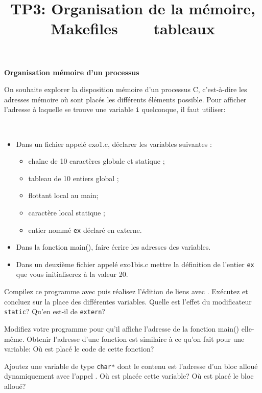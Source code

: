 \documentclass[10pt]{article}\usepackage[nu]{esial}
\begin{document}
\title{TP3: Organisation de la mémoire, Makefiles ~~~  tableaux}
\maketitle

\begin{Exercice}\textbf{Organisation mémoire d'un processus}

On souhaite explorer la disposition mémoire d'un processus C, c'est-à-dire les
adresses mémoire où sont placés les différents éléments possible. Pour afficher
l'adresse à laquelle se trouve une variable \texttt{i} quelconque, il faut
utiliser: 

\Question~\\[-\baselineskip]
\begin{itemize}
\item Dans un fichier appelé exo1.c, déclarer les variables suivantes :
  \begin{itemize}
  \item chaîne de 10 caractères globale et statique ;
  \item tableau de 10 entiers global ;
  \item flottant local au main;
  \item caractère local statique ;
  \item entier nommé \texttt{ex} déclaré en externe.
  \end{itemize}
\item Dans la fonction main(), faire écrire les adresses des variables.
\item Dans un deuxième fichier appelé exo1bis.c mettre la définition de
  l'entier \texttt{ex} que vous initialiserez à la valeur 20.
\end{itemize}

\Question Compilez ce programme avec  
puis réalisez l'édition de liens avec .
Exécutez  et concluez sur la place des différentes variables. Quelle
est l'effet du modificateur \texttt{static}? Qu'en est-il de \texttt{extern}?

\Question Modifiez votre programme pour qu'il affiche l'adresse de la fonction
main() elle-même. Obtenir l'adresse d'une fonction est similaire à ce qu'on
fait pour une variable:  Où est
placé le code de cette fonction?

\Question Ajoutez une variable de type \texttt{char*} dont le contenu est
l'adresse d'un bloc alloué dynamiquement avec l'appel . Où
est placée cette variable? Où est placé le bloc alloué?
\end{Exercice}
\end{document}
